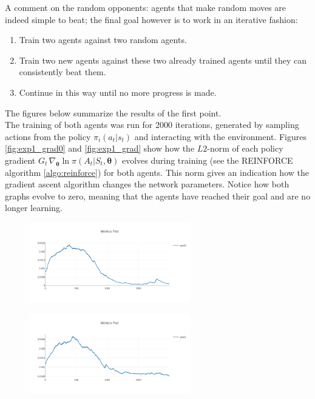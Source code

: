 A comment on the random opponents: agents that make random moves are indeed simple to beat; the final goal however is to work in an iterative fashion: 
\begin{enumerate}
    \item Train two agents against two random agents.
    \item Train two new agents against these two already trained agents until they can consistently beat them.
    \item Continue in this way until no more progress is made.
\end{enumerate}
The figures below summarize the results of the first point.\\

The training of both agents was run for 2000 iterations, generated by sampling actions from the policy $\pi_i(a_t|s_t)$ and interacting with the environment. Figures \ref{fig:exp1_grad0} and \ref{fig:exp1_grad} show how the $L2$-norm of each policy gradient $G_t \, \nabla_{\bm{\theta}} \ln \pi(A_t|S_t,\bm{\theta})$ evolves during training (see the REINFORCE algorithm \ref{algo:reinforce}) for both agents. This norm gives an indication how the gradient ascent algorithm changes the network parameters. Notice how both graphs evolve to zero, meaning that the agents have reached their goal and are no longer learning.\\
\begin{figure}
\centering
\begin{minipage}{.5\textwidth}
  \centering
  \includegraphics[width=7cm]{images/experiment3/grad0.png}
  \label{fig:exp1_grad0}
\end{minipage}%
\begin{minipage}{.5\textwidth}
  \centering
  \includegraphics[width=7cm]{images/experiment3/grad1.png}
  \label{fig:exp1_grad1}
\end{minipage}
\end{figure}

